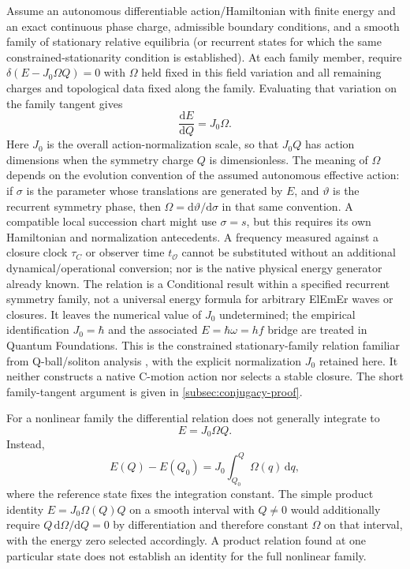 \documentclass[11pt]{article}
\theoremstyle{definition}
\newcommand{\dd}{\mathrm{d}}
\begin{document}
Assume an autonomous differentiable action/Hamiltonian with finite energy and
an exact continuous phase charge, admissible boundary conditions, and a smooth
family of stationary relative equilibria (or recurrent states for which the
same constrained-stationarity condition is established).  At each family member,
require $\delta(E-J_0\Omega Q)=0$ with $\Omega$ held fixed in this field variation
and all remaining charges and topological data fixed along the family.
Evaluating that variation on the family tangent gives
\begin{equation}
\boxed{\frac{\dd E}{\dd Q}=J_0\Omega.}
\label{eq:conjugacy}
\end{equation}
Here $J_0$ is the overall action-normalization scale, so that $J_0Q$ has action
dimensions when the symmetry charge $Q$ is dimensionless.  The meaning of $\Omega$
depends on the evolution convention of the assumed autonomous effective action: if
$\sigma$ is the parameter whose translations are generated by $E$, and $\vartheta$
is the recurrent symmetry phase, then $\Omega=\dd\vartheta/\dd\sigma$ in that same
convention.  A compatible local succession chart might use $\sigma=s$, but this
requires its own Hamiltonian and normalization antecedents.  A frequency measured
against a closure clock $\tau_C$ or observer time $t_{\mathcal O}$ cannot be substituted
without an additional dynamical/operational conversion; nor is the native physical
energy generator already known.  The relation is a Conditional result within a
specified recurrent symmetry family, not a universal energy formula for arbitrary
ElEmEr waves or closures.  It leaves the numerical value of $J_0$ undetermined;
the empirical identification $J_0=\hbar$ and the associated $E=\hbar\omega=hf$
bridge are treated in Quantum Foundations.
This is the constrained stationary-family relation familiar from Q-ball/soliton
analysis \cite{Coleman1985Qballs}, with the explicit normalization $J_0$ retained
here.  It neither constructs a native C-motion action nor selects a stable
closure.  The short family-tangent argument is given in
\cref{subsec:conjugacy-proof}.

For a nonlinear family the differential relation does not generally integrate to
\begin{equation}
E=J_0\Omega Q.
\end{equation}
Instead,
\begin{equation}
\boxed{E(Q)-E(Q_0)=J_0\int_{Q_0}^{Q}\Omega(q)\,\dd q,}
\label{eq:energy_integral}
\end{equation}
where the reference state fixes the integration constant.
The simple product identity $E=J_0\Omega(Q)Q$ on a smooth interval with $Q\ne0$
would additionally require $Q\,\dd\Omega/\dd Q=0$ by differentiation and therefore
constant $\Omega$ on that interval, with the energy zero selected accordingly.
A product relation found at one particular state does not establish an identity for
the full nonlinear family.
\end{document}

